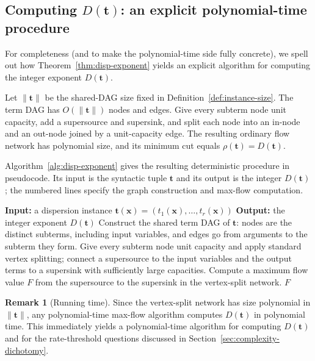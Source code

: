 \documentclass[11pt]{article}
\newcommand{\instsize}[1]{\lVert #1\rVert}
\theoremstyle{definition}
\newtheorem{remark}{Remark}[section]
\theoremstyle{plain}
\begin{document}
\subsection{Computing \texorpdfstring{$D(\mathbf t)$}{D(t)}: an explicit polynomial-time procedure}
\label{subsec:compute-exponent}

For completeness (and to make the polynomial-time side fully concrete), we spell out how
Theorem~\ref{thm:disp-exponent} yields an explicit algorithm for computing the integer exponent $D(\mathbf t)$.

Let $\instsize{\mathbf t}$ be the shared-DAG size fixed in Definition~\ref{def:instance-size}.
The term DAG has $O(\!\instsize{\mathbf t})$ nodes and edges.  Give every subterm node unit capacity, add a
supersource and supersink, and split each node into an in-node and an out-node joined by a unit-capacity edge.
The resulting ordinary flow network has polynomial size, and its minimum cut equals $\rho(\mathbf t)=D(\mathbf t)$.

Algorithm~\ref{alg:disp-exponent} gives the resulting deterministic procedure in pseudocode.  Its input is the
syntactic tuple $\mathbf t$ and its output is the integer $D(\mathbf t)$; the numbered lines specify the graph
construction and max-flow computation.

\begin{algorithm}[t]
\caption{Polynomial-time computation of $D(\mathbf t)$ by vertex-split max-flow.}
\label{alg:disp-exponent}
\begin{algorithmic}[1]
\raggedright
\State \textbf{Input:} a dispersion instance $\mathbf t(\mathbf x)=(t_1(\mathbf x),\dots,t_r(\mathbf x))$
\State \textbf{Output:} the integer exponent $D(\mathbf t)$
\State Construct the shared term DAG of $\mathbf t$: nodes are the distinct subterms, including input variables,
      and edges go from arguments to the subterm they form.
\State Give every subterm node unit capacity and apply standard vertex splitting; connect a supersource to the
      input variables and the output terms to a supersink with sufficiently large capacities.
\State Compute a maximum flow value $F$ from the supersource to the supersink in the vertex-split network.
\State \Return $F$ 
\end{algorithmic}
\end{algorithm}


\begin{remark}[Running time]
Since the vertex-split network has size polynomial in $\instsize{\mathbf t}$, any polynomial-time max-flow algorithm
computes $D(\mathbf t)$ in polynomial time.  This immediately yields a polynomial-time algorithm for computing $D(\mathbf t)$ and for the rate-threshold questions discussed in Section~\ref{sec:complexity-dichotomy}.
\end{remark}
\end{document}

